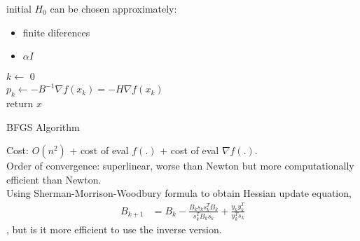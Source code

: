 \documentclass[8pt,letter]{article}
\begin{document}
\begin{multicols*}{2}
  
  initial $H_0$ can be chosen approximately:
  \begin{itemize}
  \item finite diferences
  \item $\alpha I$
  \end{itemize}
  
  \begin{algorithm}[H]
    $k \leftarrow$ 0\\
    $p_k \leftarrow -B^{-1} \nabla f(x_k) = -H\nabla f(x_k)$\\
    return $x$
    \caption{BFGS Algorithm\label{Algo_BFGS}}
  \end{algorithm}

  Cost: $O(n^2)$ + cost of eval $f(.)$ + cost of eval $\nabla f(.)$.\\
  Order of convergence: superlinear, worse than Newton but more computationally efficient than Newton.\\   
  
  Using Sherman-Morrison-Woodbury formula to obtain Hessian update equation,
  \begin{align*}
    B_{k+1} & = B_k - \frac{B_ks_k s_k^T B_k}{s_k^T B_k s_k} + \frac{y_k y_k^T}{y_k^T s_k}
  \end{align*}
  , but is it more efficient to use the inverse version.\\
  

\end{multicols*}
\end{document}
